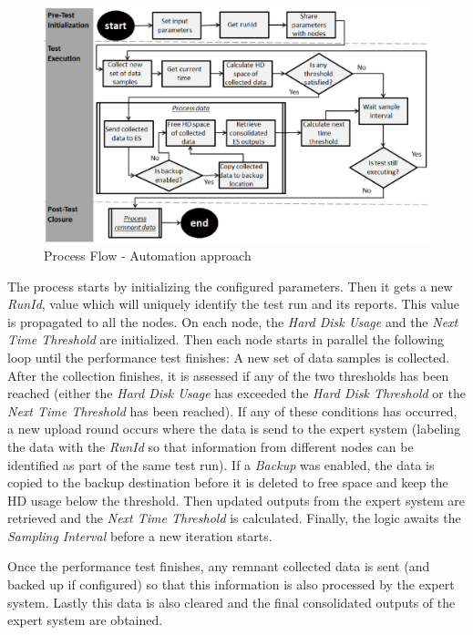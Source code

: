 \documentclass[runningheads,a4paper]{llncs}
\begin{document}
\begin{figure}[!h]
\centering
\includegraphics[width=1.0\textwidth]{ApproachDiagram}
\caption{Process Flow - Automation approach}
\label{fig_ApproachDiagram}
\end{figure}

The process starts by initializing the configured parameters. Then it gets
a new \emph{RunId}, value which will uniquely identify the test run and its reports.
This value is propagated to all the nodes. On each node, the \emph{Hard Disk
Usage} and  the \emph{Next Time Threshold} are initialized. Then each node
starts in parallel the following loop until the performance test finishes: A new
set of data samples is collected. After the collection finishes, it is assessed if any of
the two thresholds has been reached (either the \emph{Hard Disk Usage} has
exceeded the \emph{Hard Disk Threshold} or the \emph{Next Time Threshold} has
been reached). If any of these conditions has occurred, a new upload round
occurs where the data is send to the expert system (labeling the data with the
\emph{RunId} so that information from different nodes can be identified as part
of the same test run). If a \emph{Backup} was enabled, the data is copied
to the backup destination before it is deleted to free space and
keep the HD usage below the threshold. Then updated outputs from the
expert system are retrieved and the \emph{Next Time Threshold} is calculated. Finally,
the logic awaits the \emph{Sampling Interval} before a new iteration
starts.

Once the performance test finishes, any remnant collected data is sent (and
backed up if configured) so that this information is also processed by the
expert system. Lastly this data is also cleared and the final consolidated
outputs of the expert system are obtained.
\end{document}
